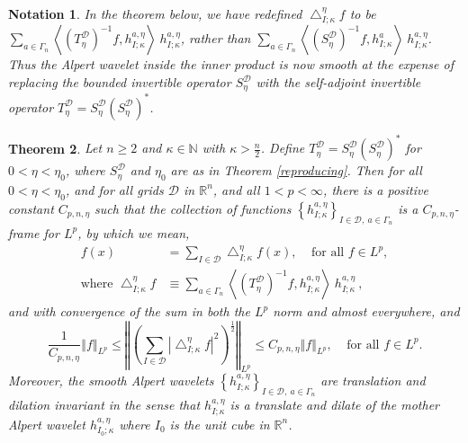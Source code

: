 \documentclass{amsart}%
\newtheorem{theorem}{Theorem}
\theoremstyle{plain}
\newtheorem{notation}[theorem]{Notation}
\numberwithin{equation}{section}
\begin{document}
\begin{notation}
In the theorem below, we have \emph{redefined} $\bigtriangleup_{I;\kappa
}^{\eta}f$ to be $\sum_{a\in\Gamma_{n}}\left\langle \left(  T_{\eta
}^{\mathcal{D}}\right)  ^{-1}f,h_{I;\kappa}^{a,\eta}\right\rangle
\ h_{I;\kappa}^{a,\eta}$, rather than $\sum_{a\in\Gamma_{n}}\left\langle
\left(  S_{\eta}^{\mathcal{D}}\right)  ^{-1}f,h_{I;\kappa}^{a}\right\rangle
\ h_{I;\kappa}^{a,\eta}$. Thus the Alpert wavelet inside the inner product is
now smooth at the expense of replacing the bounded invertible operator
$S_{\eta}^{\mathcal{D}}$ with the self-adjoint invertible operator $T_{\eta
}^{\mathcal{D}}=S_{\eta}^{\mathcal{D}}\left(  S_{\eta}^{\mathcal{D}}\right)
^{\ast}$.
\end{notation}

\begin{theorem}
\label{reproducing'}Let $n\geq2$ and $\kappa\in\mathbb{N}$ with $\kappa
>\frac{n}{2}$. Define $T_{\eta}^{\mathcal{D}}=S_{\eta}^{\mathcal{D}}\left(
S_{\eta}^{\mathcal{D}}\right)  ^{\ast}$ for $0<\eta<\eta_{0}$, where $S_{\eta
}^{\mathcal{D}}$ and $\eta_{0}$ are as in Theorem \ref{reproducing}. Then for
all $0<\eta<\eta_{0}$, and for all grids $\mathcal{D}$ in $\mathbb{R}^{n}$,
and all $1<p<\infty$, there is a positive constant $C_{p,n,\eta}$ such that
the collection of functions $\left\{  h_{I;\kappa}^{a,\eta}\right\}
_{I\in\mathcal{D},\ a\in\Gamma_{n}}$ is a $C_{p,n,\eta}$-frame for $L^{p}$, by
which we mean,%
\begin{align}
f\left(  x\right)   & =\sum_{I\in\mathcal{D}}\bigtriangleup_{I;\kappa}^{\eta
}f\left(  x\right)  ,\ \ \ \ \ \text{for all }f\in L^{p}%
,\label{bounded below'}\\
\text{where }\bigtriangleup_{I;\kappa}^{\eta}f  & \equiv\sum_{a\in\Gamma_{n}%
}\left\langle \left(  T_{\eta}^{\mathcal{D}}\right)  ^{-1}f,h_{I;\kappa
}^{a,\eta}\right\rangle \ h_{I;\kappa}^{a,\eta}\ ,\nonumber
\end{align}
and with convergence of the sum in both the $L^{p}$ norm and almost
everywhere, and%
\begin{equation}
\frac{1}{C_{p,n,\eta}}\left\Vert f\right\Vert _{L^{p}}\leq\left\Vert \left(
\sum_{I\in\mathcal{D}}\left\vert \bigtriangleup_{I;\kappa}^{\eta}f\right\vert
^{2}\right)  ^{\frac{1}{2}}\right\Vert _{L^{p}}\leq C_{p,n,\eta}\left\Vert
f\right\Vert _{L^{p}},\ \ \ \ \ \text{for all }f\in L^{p}.\label{square est'}%
\end{equation}
Moreover, the smooth Alpert wavelets $\left\{  h_{I;\kappa}^{a,\eta}\right\}
_{I\in\mathcal{D},\ a\in\Gamma_{n}}$ are translation and dilation invariant in
the sense that $h_{I;\kappa}^{a,\eta}$ is a translate and dilate of the mother
Alpert wavelet $h_{I_{0};\kappa}^{a,\eta}$ where $I_{0}$ is the unit cube in
$\mathbb{R}^{n}$.
\end{theorem}
\end{document}
